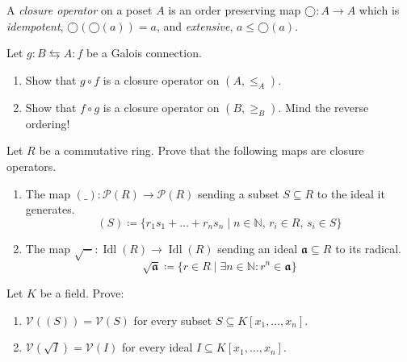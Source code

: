 \documentclass{exercises}
\DeclareMathOperator{\Idl}{Idl}
\begin{document}
\begin{exercise}
  A \emph{closure operator} on a poset $A$ is an order preserving map $◯:A → A$ which is \emph{idempotent}, $◯(◯(a)) = a$, and \emph{extensive}, $a ≤ ◯(a)$.

  Let $g:B ⇆ A:f$ be a Galois connection.
  \begin{enumerate}
    \item Show that $g∘f$ is a closure operator on $(A,≤_A)$.
    \item Show that $f∘g$ is a closure operator on $(B,≥_B)$.
      {\scriptsize Mind the reverse ordering!}
  \end{enumerate}
  Let $R$ be a commutative ring.
  Prove that the following maps are closure operators.
  \begin{enumerate}[start=3]
    \item The map $(\_):𝒫(R) → 𝒫(R)$ sending a subset $S⊆R$ to the ideal it generates. 
      $$
      (S)\coloneqq \{r_1s_1 + \dots + r_ns_n \mid n ∈ ℕ,\, r_i ∈ R,\, s_i ∈ S\}
      $$
    \item The map $\sqrt{-}:\Idl(R) → \Idl(R)$ sending an ideal $𝖆⊆R$ to its radical.
      $$
      \sqrt{𝖆}\coloneqq\{r ∈ R \mid ∃n ∈ ℕ : r^n ∈ 𝖆\}
      $$
  \end{enumerate}
  Let $K$ be a field.
  Prove:
  \begin{enumerate}[start=5]
    \item $𝒱((S))=𝒱(S)$ for every subset $S⊆K[x_1,\dots,x_n]$.
    \item $𝒱(\sqrt{I})=𝒱(I)$ for every ideal $I⊆K[x_1,\dots,x_n]$.
  \end{enumerate}
\end{exercise}
\end{document}
